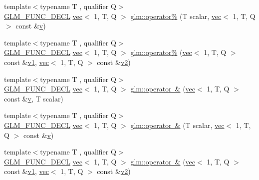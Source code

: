 \begin{DoxyCompactItemize}
\item 
{\footnotesize template$<$typename T , qualifier Q$>$ }\\\mbox{\hyperlink{setup_8hpp_ab2d052de21a70539923e9bcbf6e83a51}{G\+L\+M\+\_\+\+F\+U\+N\+C\+\_\+\+D\+E\+CL}} \mbox{\hyperlink{structglm_1_1vec}{vec}}$<$ 1, T, Q $>$ \mbox{\hyperlink{group__ext__vec1_gafaa74182cb9679e2b23567fc4da42bf8}{glm\+::operator\%}} (T scalar, \mbox{\hyperlink{structglm_1_1vec}{vec}}$<$ 1, T, Q $>$ const \&\mbox{\hyperlink{_s_d_l__opengl_8h_a10a82eabcb59d2fcd74acee063775f90}{v}})
\item 
{\footnotesize template$<$typename T , qualifier Q$>$ }\\\mbox{\hyperlink{setup_8hpp_ab2d052de21a70539923e9bcbf6e83a51}{G\+L\+M\+\_\+\+F\+U\+N\+C\+\_\+\+D\+E\+CL}} \mbox{\hyperlink{structglm_1_1vec}{vec}}$<$ 1, T, Q $>$ \mbox{\hyperlink{group__ext__vec1_ga1a6ce0ed38acf01fa29b2ad451175496}{glm\+::operator\%}} (\mbox{\hyperlink{structglm_1_1vec}{vec}}$<$ 1, T, Q $>$ const \&\mbox{\hyperlink{_s_d_l__opengl__glext_8h_a435c176a02c061b43e19bdf7c86cceae}{v1}}, \mbox{\hyperlink{structglm_1_1vec}{vec}}$<$ 1, T, Q $>$ const \&\mbox{\hyperlink{_s_d_l__opengl__glext_8h_a0928f6d0f0f794ba000a21dfae422136}{v2}})
\item 
{\footnotesize template$<$typename T , qualifier Q$>$ }\\\mbox{\hyperlink{setup_8hpp_ab2d052de21a70539923e9bcbf6e83a51}{G\+L\+M\+\_\+\+F\+U\+N\+C\+\_\+\+D\+E\+CL}} \mbox{\hyperlink{structglm_1_1vec}{vec}}$<$ 1, T, Q $>$ \mbox{\hyperlink{group__ext__vec1_ga62a75b0dadc3e908b03bf03bee891e6d}{glm\+::operator \&}} (\mbox{\hyperlink{structglm_1_1vec}{vec}}$<$ 1, T, Q $>$ const \&\mbox{\hyperlink{_s_d_l__opengl_8h_a10a82eabcb59d2fcd74acee063775f90}{v}}, T scalar)
\item 
{\footnotesize template$<$typename T , qualifier Q$>$ }\\\mbox{\hyperlink{setup_8hpp_ab2d052de21a70539923e9bcbf6e83a51}{G\+L\+M\+\_\+\+F\+U\+N\+C\+\_\+\+D\+E\+CL}} \mbox{\hyperlink{structglm_1_1vec}{vec}}$<$ 1, T, Q $>$ \mbox{\hyperlink{group__ext__vec1_ga6637b42fbf149b977ce3f66571be212a}{glm\+::operator \&}} (T scalar, \mbox{\hyperlink{structglm_1_1vec}{vec}}$<$ 1, T, Q $>$ const \&\mbox{\hyperlink{_s_d_l__opengl_8h_a10a82eabcb59d2fcd74acee063775f90}{v}})
\item 
{\footnotesize template$<$typename T , qualifier Q$>$ }\\\mbox{\hyperlink{setup_8hpp_ab2d052de21a70539923e9bcbf6e83a51}{G\+L\+M\+\_\+\+F\+U\+N\+C\+\_\+\+D\+E\+CL}} \mbox{\hyperlink{structglm_1_1vec}{vec}}$<$ 1, T, Q $>$ \mbox{\hyperlink{group__ext__vec1_ga9f942c4c4e896e42f1810824f7af294b}{glm\+::operator \&}} (\mbox{\hyperlink{structglm_1_1vec}{vec}}$<$ 1, T, Q $>$ const \&\mbox{\hyperlink{_s_d_l__opengl__glext_8h_a435c176a02c061b43e19bdf7c86cceae}{v1}}, \mbox{\hyperlink{structglm_1_1vec}{vec}}$<$ 1, T, Q $>$ const \&\mbox{\hyperlink{_s_d_l__opengl__glext_8h_a0928f6d0f0f794ba000a21dfae422136}{v2}})

\end{DoxyCompactItemize}
